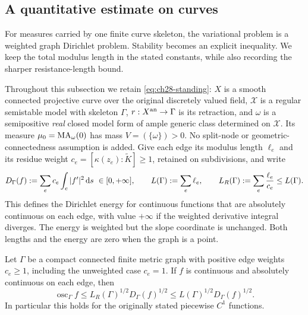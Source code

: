 \subsection{A quantitative estimate on curves}
\label{sec:ch28-curve-stability}

For measures carried by one finite curve skeleton, the variational problem
is a weighted graph Dirichlet problem.  Stability becomes an explicit
inequality.  We keep the total modulus length in the stated constants,
while also recording the sharper resistance-length bound.

Throughout this subsection we retain \eqref{eq:ch28-standing}:
\(X\) is a smooth connected projective curve over the original discretely
valued field, \(\mathcal X\) is a regular semistable model with skeleton
\(\Gamma\), \(r:X^{\mathrm{an}}\to\Gamma\) is its retraction, and \(\omega\)
is a semipositive \emph{real} closed model form of ample generic class
determined on \(\mathcal X\).  Its measure \(\mu_0=\operatorname{MA}_\omega(0)\)
has mass \(V=(\{\omega\})>0\).  No split-node or geometric-connectedness
assumption is added.  Give each edge its modulus length \(\ell_e\) and
its residue weight \(c_e=[\kappa(z_e):\widetilde K]\geq1\), retained
on subdivisions, and write
\begin{equation}
\label{eq:ch28-dirichlet-form}
 D_\Gamma(f):=\sum_e c_e\int_e|f'|^2\,\mathrm d s\ \in[0,+\infty],
 \qquad L(\Gamma):=\sum_e\ell_e,
 \qquad L_R(\Gamma):=\sum_e\frac{\ell_e}{c_e}\leq L(\Gamma).
\end{equation}
This defines the Dirichlet energy for continuous functions that are
absolutely continuous on each edge, with value \(+\infty\) if the
weighted derivative integral diverges.  The energy is weighted but the
slope coordinate is unchanged.  Both lengths and the energy are zero
when the graph is a point.

\begin{lemma}
\label{lem:ch28-graph-sobolev}
Let \(\Gamma\) be a compact connected finite metric graph with positive
edge weights \(c_e\geq1\), including the unweighted case \(c_e=1\).
If \(f\) is continuous and absolutely continuous on each edge, then
\begin{equation}
\label{eq:ch28-graph-sobolev}
 \operatorname{osc}_\Gamma f
 \leq L_R(\Gamma)^{1/2}D_\Gamma(f)^{1/2}
 \leq L(\Gamma)^{1/2}D_\Gamma(f)^{1/2}.
\end{equation}
In particular this holds for the originally stated piecewise \(C^1\)
functions.
\end{lemma}

